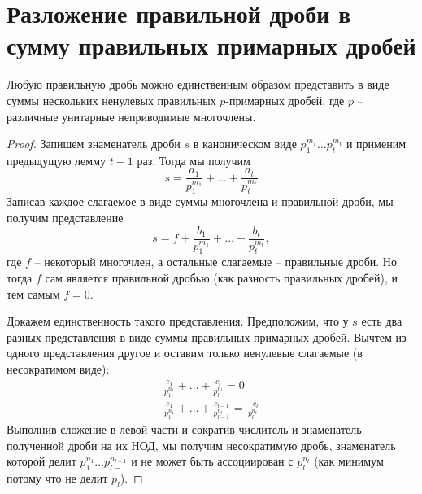 \section{Разложение правильной дроби в сумму правильных примарных дробей}
\begin{theorem-non}
    Любую правильную дробь можно единственным образом представить в виде суммы нескольких ненулевых правильных $p$-примарных дробей, 
    где $p$ -- различные унитарные неприводимые многочлены.
\end{theorem-non}

\begin{proof}
    Запишем знаменатель дроби $s$ в каноническом виде $p_1^{m_1} \dots p_t^{m_t}$ и применим предыдущую лемму $t - 1$ раз. 
    Тогда мы получим \[ s = \frac{a_1}{p_1^{m_1}} + \dots + \frac{a_t}{p_t^{m_t}} \]
    Записав каждое слагаемое в виде суммы многочлена и правильной дроби, мы получим представление
    \[ s = f + \frac{b_1}{p_1^{m_1}} + \dots + \frac{b_t}{p_t^{m_t}}, \]
    где $f$ -- некоторый многочлен, а остальные слагаемые -- правильные дроби. 
    Но тогда $f$ сам является правильной дробью (как разность правильных дробей), и тем самым $f = 0$.

    Докажем единственность такого представления. 
    Предположим, что у $s$ есть два разных представления в виде суммы правильных примарных дробей. 
    Вычтем из одного представления другое и оставим только ненулевые слагаемые (в несократимом виде):
    \begin{gather*}
        \frac{c_1}{p_1^{n_1}} + \dots + \frac{c_l}{p_l^{n_l}} = 0 \\
        \frac{c_1}{p_1^{n_1}} + \dots + \frac{c_{l - 1}}{p_{l - 1}^{n_{l - 1}}} = \frac{-c_l}{p_l^{n_l}}
    \end{gather*}
    Выполнив сложение в левой части и сократив числитель и знаменатель полученной дроби на их НОД, мы получим несократимую дробь,
    знаменатель которой делит $p_1^{n_1} \dots p_{l - 1}^{n_{l - 1}}$ и не может быть ассоциирован с $p_l^{n_l}$ (как минимум потому что не делит $p_l$).
    
\end{proof}

